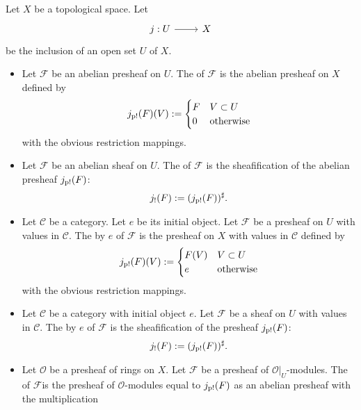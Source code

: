 \documentclass [11 pt, oneside] {article}
\begin{document}
\begin{definition}\label{}\text{}
Let $X$ be a topological space. Let
\[
\begin{tikzcd}
	j:U\ar[r]& X
\end{tikzcd}
\]
be the inclusion of an open set $U$ of $X$.
\begin{itemize}
	\item Let $\mathscr{F}$ be an abelian presheaf on $U$. The  of $\mathscr{F}$ is the abelian presheaf on $X$ defined by
		\begin{align*}
			j_{\textup {p!}}(\relax{F}) (V) :=
			 \begin{cases}
				 \relax{F} & V\subset U\\
				 0&\textrm{otherwise}
			\end{cases}
		\end{align*}
		with the obvious restriction mappings. 
	\item Let $\mathscr{F}$ be an abelian sheaf on $U$. The  of $\mathscr{F}$ is the sheafification of the abelian presheaf $j_{\textup {p!}}(\relax{F})$:
		\begin{align*}
			j_{!}(\relax{F}) := (j_{\textup {p!}}(\relax{F})) ^{\sharp}.
		\end{align*}
	\item Let $\mathscr{C}$ be a category. Let $e$ be its initial object. Let $\mathscr{F}$ be a presheaf on $U$ with values in $\mathscr{C}$. The  by $e$ of $\mathscr{F}$ is the presheaf on $X$ with values in $\mathscr{C}$ defined by
		\begin{align*}
			j_{\textup {p!}}(\relax{F}) (V) := 
			 \begin{cases}
				 \relax{F}(V)& V\subset U\\
				 e&\textrm{otherwise}
			\end{cases}
		\end{align*}
		with the obvious restriction mappings.
	\item Let $\mathscr{C}$ be a category with initial object $e$. Let $\mathscr{F}$ be a sheaf on $U$ with values in $\mathscr{C}$. The  by $e$ of $\mathscr{F}$ is the sheafification of the presheaf $j_{\textup {p!}}(\relax{F})$:
		\begin{align*}
			j_{!}(\relax{F}) := (j_{\textup {p!}}(\relax{F})) ^{\sharp}.
		\end{align*}
	\item Let $\mathscr{O}$ be a presheaf of rings on $X$. Let $\mathscr{F}$ be a presheaf of $\mathscr{O}\big|_{U}$-modules. The  of $\mathscr{F}$is the presheaf of $\mathscr{O}$-modules equal to $j_{\textup {p!}}(\relax{F})$ as an abelian presheaf with the multiplication

\end{itemize}
\end{definition}
\end{document}
